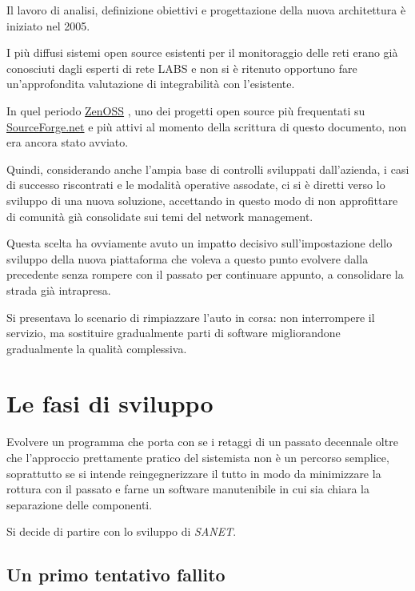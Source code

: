 \documentclass[a4wide,10pt,italian]{manual}
\begin{document}
Il lavoro di analisi, definizione obiettivi e progettazione della nuova architettura è
iniziato nel 2005.

I più diffusi sistemi open source esistenti per il monitoraggio delle reti erano già
conosciuti dagli esperti di rete LABS e non si è ritenuto opportuno fare un'approfondita valutazione
di integrabilità con l'esistente.

In quel periodo \href{http://zenoss.org}{ZenOSS} , uno dei progetti open source più frequentati
su \href{http://sourceforge.net}{SourceForge.net} e più attivi al momento della scrittura di questo documento,
non era ancora stato avviato.

Quindi, considerando anche l'ampia base di controlli sviluppati dall'azienda, i casi di successo riscontrati
e le modalità operative assodate, ci si è diretti verso lo sviluppo di una nuova soluzione,
accettando in questo modo di non approfittare di comunità già consolidate sui temi del network management.

Questa scelta ha ovviamente avuto un impatto decisivo sull'impostazione dello sviluppo della nuova piattaforma
che voleva a questo punto evolvere dalla precedente senza rompere con il passato per continuare appunto,
a consolidare la strada già intrapresa.

Si presentava lo scenario di rimpiazzare l'auto in corsa: non interrompere il servizio, ma sostituire gradualmente parti
di software migliorandone gradualmente la qualità complessiva.

\resetcurrentobjects
\hypertarget{--doc-development}{}

\chapter{Le fasi di sviluppo}

Evolvere un programma che porta con se i retaggi di un passato decennale
oltre che l'approccio prettamente pratico del sistemista non è un percorso semplice,
soprattutto se si intende reingegnerizzare il tutto in modo da minimizzare la rottura
con il passato e farne un software manutenibile in cui sia chiara la separazione delle componenti.

Si decide di partire con lo sviluppo di \emph{SANET}.


\hypertarget{first-attempt-failed}{}\section{Un primo tentativo fallito}
\end{document}
